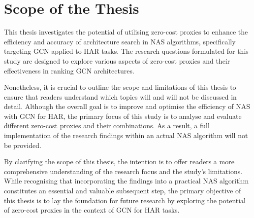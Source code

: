 \section{Scope of the Thesis}

This thesis investigates the potential of utilising zero-cost proxies to enhance the efficiency and accuracy of architecture search in \gls{NAS} algorithms, specifically targeting \gls{GCN} applied to \gls{HAR} tasks. The research questions formulated for this study are designed to explore various aspects of zero-cost proxies and their effectiveness in ranking \gls{GCN} architectures.

Nonetheless, it is crucial to outline the scope and limitations of this thesis to ensure that readers understand which topics will and will not be discussed in detail. Although the overall goal is to improve and optimise the efficiency of \gls{NAS} with \gls{GCN} for \gls{HAR}, the primary focus of this study is to analyse and evaluate different zero-cost proxies and their combinations. As a result, a full implementation of the research findings within an actual \gls{NAS} algorithm will not be provided.

By clarifying the scope of this thesis, the intention is to offer readers a more comprehensive understanding of the research focus and the study's limitations. While recognising that incorporating the findings into a practical \gls{NAS} algorithm constitutes an essential and valuable subsequent step, the primary objective of this thesis is to lay the foundation for future research by exploring the potential of zero-cost proxies in the context of \gls{GCN} for \gls{HAR} tasks.